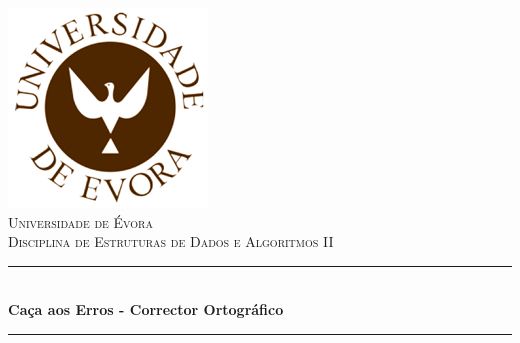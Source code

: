 \begin{titlepage}

\newcommand{\HRule}{\rule{\linewidth}{0.5mm}} %

\center %





\includegraphics[scale=0.5]{uevora.png}\\[0.5cm] %

 

\textsc{\LARGE Universidade de Évora}\\[1.5cm] %
\textsc{\Large Disciplina de Estruturas de Dados e Algoritmos II}\\[0.5cm]



\HRule \\[0.4cm]
{ \huge \bfseries Caça aos Erros - Corrector Ortográfico}\\[0.4cm] %
\HRule \\[1cm]
 

\end{titlepage}
